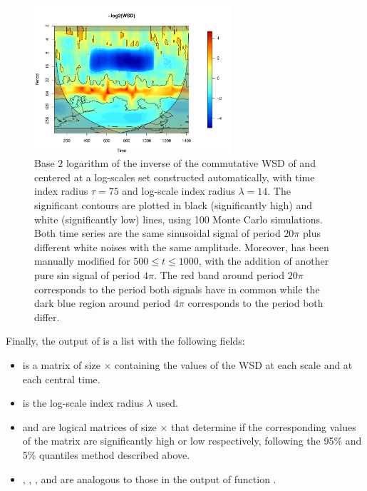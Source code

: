 \begin{figure}[tbp]
\begin{center}
  \includegraphics[width=0.65\textwidth]{Figure7}
\end{center}
\caption{Base $2$ logarithm of the inverse of the commutative WSD of  and  centered at a log-scales set constructed automatically, with time index radius $\tau =75$ and log-scale index radius $\lambda =14$. The significant contours are plotted in black (significantly high) and white (significantly low) lines, using 100 Monte Carlo simulations. Both time series are the same sinusoidal signal of period $20\pi$ plus different white noises with the same amplitude. Moreover,  has been manually modified for $500\leq t\leq 1000$, with the addition of another pure sin signal of period $4\pi$.  The red band around period $20\pi$ corresponds to the period both signals have in common while the dark blue region around period $4\pi$ corresponds to the period both differ.}
\label{fig:wsd}
\end{figure}

Finally, the output of  is a list with the following fields:
\begin{itemize}
\item {} is a matrix of size $\times $ containing the values of the WSD at each scale and at each central time.
\item {} is the log-scale index radius $\lambda $ used.
\item {} and  are logical matrices of size $\times $ that determine if the corresponding values of the  matrix are significantly high or low respectively, following the 95\% and 5\% quantiles method described above.
\item {}, , ,  and  are analogous to those in the output of function .
\end{itemize}

